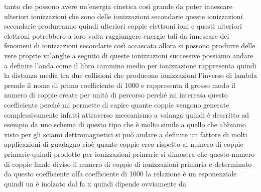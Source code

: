 {tanto che possono avere un'energia cinetica così grande da poter innescare ulteriori ionizzazioni che sono delle ionizzazioni secondarie queste ionizzazioni secondarie produrranno quindi ulteriori coppie elettroni ioni e questi ulteriori elettroni potrebbero a loro volta raggiungere energie tali da innescare dei fenomeni di ionizzazioni secondarie così accascata allora si possono produrre delle vere proprie valanghe a seguito di queste ionizzazioni successive possiamo andare a definire l'anda come il libro cammino medio per ionizzazione rappresenta quindi la distanza media tra due collisioni che producono ionizzazioni l'inverso di lambda prende il nome di primo coefficiente di 1000 e rappresenta il grosso modo il numero di coppie create per unità di percorso perché mi interessa questo coefficiente perché mi permette di capire quante coppie vengono generate complessivamente infatti attraverso meccanismo a valanga quindi è descritto ad esempio da uno schema di questo tipo che è molto simile a quello che abbiamo visto per gli sciami dettromagnetici si può andare a definire un fattore di molti applicazioni di guadagno cioè quante coppie creo rispetto al numero di coppie primarie quindi prodotte per ionizzazioni primarie si dimostra che questo numero di coppie finale diviso il numero di coppie di ionizzazioni primaria e determinato da questo coefficiente alfa coefficiente di 1000 la relazione è un esponenziale quindi un è inolzato dal fa x quindi dipende ovviamente da 

}
